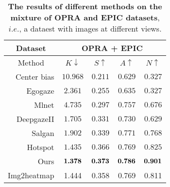 \documentclass[journal,twoside]{IEEEtran}
\begin{document}
\begin{table}[t]
    \caption{\textbf{The results of different methods on the mixture of OPRA \cite{demo2vec2018cvpr} and EPIC \cite{Damen2018EPICKITCHENS} datasets}, $i.e.$, a dataest with images at different views.
    }
    \label{Table:2}
  \begin{center}
  \small
  \renewcommand{\arraystretch}{1.}
  \renewcommand{\tabcolsep}{8pt}
  \begin{tabular}{r|cccc}
    \hline\toprule
    \multicolumn{1}{c|}{\textbf{Dataset}} & \multicolumn{4}{c}{\textbf{OPRA} \cite{demo2vec2018cvpr} \textbf{+} \textbf{EPIC} \cite{Damen2018EPICKITCHENS}} \\ 
    \hline
    \multicolumn{1}{c|}{Method} & \emph{$K\downarrow$} & \emph{$S\uparrow$} & \emph{$A\uparrow$} & \emph{$N\uparrow$} \\
    \hline
    Center bias & $10.968$ & $0.211$ & $0.629$ & $0.327$ \\	
    Egogaze\cite{DBLP:conf/eccv/HuangCLS18} &	$2.361$ & $0.255$ & $0.635$ & $0.327$   \\
    Mlnet\cite{DBLP:conf/icpr/CorniaBSC16} & $4.735$ & $0.297$ & $0.757$ & $0.676$  \\
    DeepgazeII\cite{Pan_2017_SalGAN} & $1.705$ & $0.331$ & $0.730$ & $0.629$  \\
    Salgan\cite{DBLP:journals/corr/KummererWB16} & $1.902$ & $0.339$ & $0.771$ & $0.768$   \\
    Hotspot\cite{interaction-hotspots} & $1.435$ & $0.366$ & $0.769$ & $0.825$ \\
     \hline
     \rowcolor{mygray}
    Ours & $\normalsize\textbf{1.378}$ & $\normalsize\textbf{0.373}$ & $\normalsize\textbf{0.786}$ & $\normalsize\textbf{0.901}$   \\    
     \hline
    Img2heatmap \cite{interaction-hotspots} & 1.444 & 0.358 & 0.769 & 0.811 \\
    \hline\bottomrule
    \end{tabular}
    \end{center}
  
  \end{table}
\end{document}
